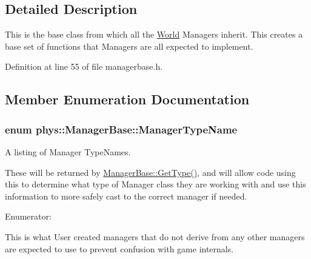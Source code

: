 \subsection{Detailed Description}
This is the base class from which all the \hyperlink{classphys_1_1World}{World} Managers inherit. This creates a base set of functions that Managers are all expected to implement. 

Definition at line 55 of file managerbase.h.



\subsection{Member Enumeration Documentation}
\hypertarget{classphys_1_1ManagerBase_aaa6ccddf23892eaccb898529414f80a5}{
\subsubsection[{ManagerTypeName}]{\setlength{\rightskip}{0pt plus 5cm}enum {\bf phys::ManagerBase::ManagerTypeName}}}
\label{d2/de3/classphys_1_1ManagerBase_aaa6ccddf23892eaccb898529414f80a5}


A listing of Manager TypeNames. 

These will be returned by \hyperlink{classphys_1_1ManagerBase_aff400b6599db635e24796d8221e9a0e3}{ManagerBase::GetType()}, and will allow code using this to determine what type of Manager class they are working with and use this information to more safely cast to the correct manager if needed. \begin{Desc}
\item[Enumerator: ]\par
\begin{description}
\item[{\em 
\hypertarget{classphys_1_1ManagerBase_aaa6ccddf23892eaccb898529414f80a5a3239296e554feede76c4bcb6f824c66c}{
UserCreated}
\label{d2/de3/classphys_1_1ManagerBase_aaa6ccddf23892eaccb898529414f80a5a3239296e554feede76c4bcb6f824c66c}
}]This is what User created managers that do not derive from any other managers are expected to use to prevent confusion with game internals. \end{description}
\end{Desc}



